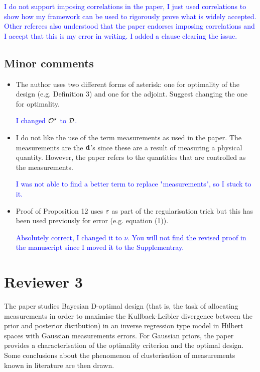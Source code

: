 \documentclass{amsart}
\newcommand{\answer}[1]{\vskip 0.05in \textcolor{blue}{#1} \vskip 0.05in}
\begin{document}
\answer{I do not support imposing correlations in the paper, I just
used correlations to show how my framework can be used to rigorously
prove what is widely accepted. Other referees also understood that the
paper endorses imposing correlations and I accept that this is my
error in writing. I added a clause clearing the issue.}

\subsection{Minor comments}
\begin{itemize}
\item The author uses two different forms of asterisk: one for
  optimality of the design (e.g. Definition 3) and one for the
  adjoint. Suggest changing the one for optimality.

  \answer{I changed $\mathcal{O}^\star$ to $\mathcal{D}$.}
  
\item I do not like the use of the term measurements as used in the
  paper. The measurements are the $\mathbf{d}$’s since these are a result
  of measuring a physical quantity. However, the paper refers to the
  quantities that are controlled as the measurements.

  \answer{I was not able to find a better term to replace
  "measurements", so I stuck to it.}
  
\item Proof of Proposition 12 uses $\varepsilon$ as part of the
  regularisation trick but this has been used previously for error
  (e.g. equation (1)).

  \answer{Absolutely correct, I changed it to $\nu$. You will not
  find the revised proof in the manuscript since I moved it to the
  Supplementray.}
\end{itemize}




\section{Reviewer 3}
The paper studies Bayesian D-optimal design (that is, the task of
allocating measurements in order to maximise the Kullback-Leibler
divergence between the prior and posterior disribution) in an inverse
regression type model in Hilbert spaces with Gaussian measurements
errors. For Gaussian priors, the paper provides a characterisation of
the optimality criterion and the optimal design. Some conclusions
about the phenomenon of clusterisation of measurements known in
literature are then drawn.
\end{document}
